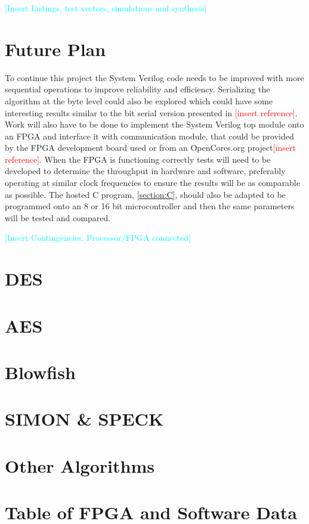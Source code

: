 \documentclass[12pt,twoside,a4paper]{report}
\begin{document}
    \textcolor{cyan}{[Insert Listings, test vectors, simulations and synthesis]}
    
    \chapter{Future Plan}
    To continue this project the System Verilog code needs to be improved with more sequential operations to improve reliability and efficiency. Serializing the algorithm at the byte level could also be explored which could have some interesting results similar to the bit serial version presented in \textcolor{red}{[insert reference]}. Work will also have to be done to implement the System Verilog top module onto an FPGA and interface it with communication module, that could be provided by the FPGA development board used or from an OpenCores.org project\textcolor{red}{[insert reference]}. When the FPGA is functioning correctly tests will need to be developed to determine the throughput in hardware and software, preferably operating at similar clock frequencies to ensure the results will be as comparable as possible. The hosted C program, \autoref{section:C}, should also be adapted to be programmed onto an 8 or 16 bit microcontroller and then the same parameters will be tested and compared.
    
    \textcolor{cyan}{[Insert Contingencies, Processor/FPGA connected]}
    
    
    
     
    \appendix
    
    \chapter{DES}
    
    \chapter{AES}

    \chapter{Blowfish}

    \chapter{SIMON \& SPECK}

    \chapter{Other Algorithms}

    \chapter{Table of FPGA and Software Data}
     
\end{document}
